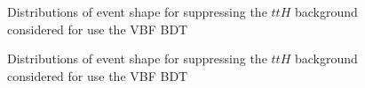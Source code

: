 \begin{figure}[htbp]

     

    \caption{Distributions of event shape for suppressing the $ttH$ background considered for use the VBF BDT}
    \label{fig:yy-focused-variables}
\end{figure}
\begin{figure}[htbp]\ContinuedFloat
        
    \caption{Distributions of event shape for suppressing the $ttH$ background considered for use the VBF BDT}
    \label{fig:yy-focused-variables}
\end{figure}


